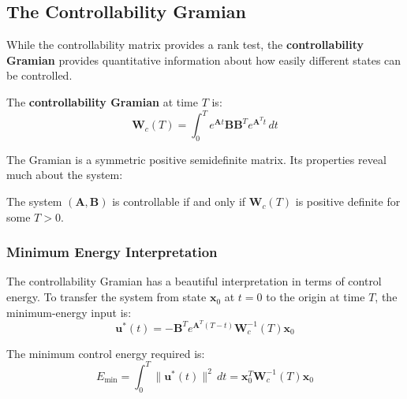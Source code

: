 \subsection{The Controllability Gramian}

While the controllability matrix provides a rank test, the \textbf{controllability Gramian} provides quantitative information about how easily different states can be controlled.

\begin{definition}
The \textbf{controllability Gramian} at time $T$ is:
\begin{equation}
\mathbf{W}_c(T) = \int_0^T e^{\mathbf{A}t}\mathbf{B}\mathbf{B}^Te^{\mathbf{A}^Tt} \, dt
\label{eq:controllability_gramian_finite}
\end{equation}
\end{definition}

The Gramian is a symmetric positive semidefinite matrix. Its properties reveal much about the system:

\begin{theorem}
The system $(\mathbf{A}, \mathbf{B})$ is controllable if and only if $\mathbf{W}_c(T)$ is positive definite for some $T > 0$.
\end{theorem}

\subsubsection{Minimum Energy Interpretation}

The controllability Gramian has a beautiful interpretation in terms of control energy. To transfer the system from state $\mathbf{x}_0$ at $t = 0$ to the origin at time $T$, the minimum-energy input is:
\begin{equation}
\mathbf{u}^*(t) = -\mathbf{B}^T e^{\mathbf{A}^T(T-t)} \mathbf{W}_c^{-1}(T) \mathbf{x}_0
\end{equation}

The minimum control energy required is:
\begin{equation}
E_{\min} = \int_0^T \|\mathbf{u}^*(t)\|^2 \, dt = \mathbf{x}_0^T \mathbf{W}_c^{-1}(T) \mathbf{x}_0
\end{equation}


